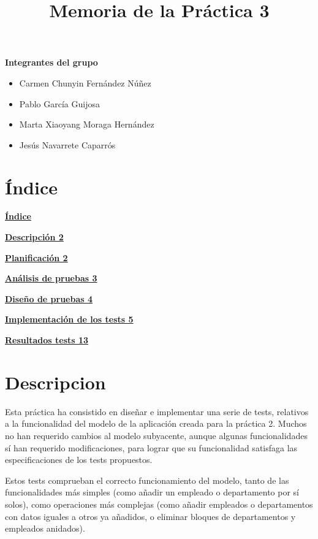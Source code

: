 \documentclass[openany]{article}
\title{Memoria de la Práctica 3}
\begin{document}
\maketitle
\textbf{Integrantes del grupo}

\begin{itemize}
\item
  Carmen Chunyin Fernández Núñez
\item
  Pablo García Guijosa
\item
  Marta Xiaoyang Moraga Hernández
\item
  Jesús Navarrete Caparrós
\end{itemize}

\section{Índice}\label{uxedndice}

\hyperref[uxedndice]{\textbf{Índice}}

\hyperref[intro]{\textbf{Descripción 2}}

\hyperref[plan]{\textbf{Planificación 2}}

\hyperref[ana]{\textbf{Análisis de pruebas 3}}

\hyperref[dis]{\textbf{Diseño de pruebas 4}}

\hyperref[test]{\textbf{Implementación de los tests 5}}

\hyperref[results]{\textbf{Resultados tests 13}}

\pagebreak

 
\section{Descripcion}\label{intro}
Esta práctica ha consistido en diseñar e implementar una serie de tests, relativos a la funcionalidad del modelo de la aplicación creada para la práctica 2. Muchos no han requerido cambios al modelo subyacente, aunque algunas funcionalidades sí han requerido modificaciones, para lograr que su funcionalidad satisfaga las especificaciones de los tests propuestos.
\newline

Estos tests comprueban el correcto funcionamiento del modelo, tanto de las funcionalidades más simples (como añadir un empleado o departamento por sí solos), como operaciones más complejas (como añadir empleados o departamentos con datos iguales a otros ya añadidos, o eliminar bloques de departamentos y empleados anidados).
\newline
\end{document}
